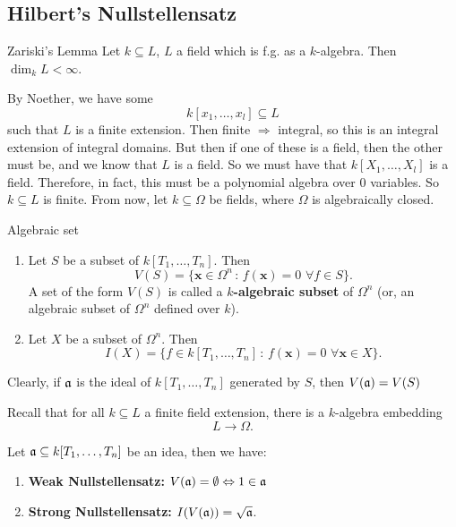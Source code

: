 \documentclass{article}
\begin{document}
\subsection{Hilbert's Nullstellensatz}
\begin{fancyprop}{Zariski's Lemma}
    Let $k \subseteq L$, $L$ a field which is f.g. as a $k$-algebra. Then $\dim_{k} L < \infty$.
\end{fancyprop}
\proof By Noether, we have some \[ k[x_{1}, \dots, x_{l}] \subseteq L \] such that $L$ is a finite extension. Then finite $\Rightarrow$ integral, so this is an integral extension of integral domains. But then if one of these is a field, then the other must be, and we know that $L$ is a field. So we must have that $k[X_{1}, \dots, X_{l}]$ is a field. Therefore, in fact, this must be a polynomial algebra over $0$ variables. So $k \subseteq L$ is finite. \endproof
From now, let $k \subseteq \Omega$ be fields, where $\Omega$ is algebraically closed.
\begin{fancydefine}{Algebraic set}
    \hspace{0.1cm}
    \begin{enumerate}
        \item Let $S$ be a subset of $k[T_{1}, \dots, T_{n}]$. Then \[V(S) = \{ \mathbf{x} \in \Omega^{n} \, : \, f(\mathbf{x}) = 0 \,\, \forall f \in S\}.\] A set of the form $V(S)$ is called a $k$\textbf{-algebraic subset} of $\Omega^{n}$ (or, an algebraic subset of $\Omega^{n}$ defined over $k$).
        \item Let $X$ be a subset of $\Omega^{n}$. Then \[ I(X) = \{ f \in k[T_{1},\dots, T_{n}] \, : \, f(\mathbf{x}) = 0 \,\, \forall \mathbf{x} \in X\}.\]
    \end{enumerate}
    Clearly, if $\mathfrak{a}$ is the ideal of $k[T_{1}, \dots, T_{n}]$ generated by $S$, then $V(\mathfrak{a}) = V(S)$
\end{fancydefine}
Recall that for all $k \subseteq L$ a finite field extension, there is a $k$-algebra embedding \[ L \to \Omega.\]
\begin{fancythm}{}
    Let $\mathfrak{a} \subseteq k[T_{1}, \dots, T_{n}]$ be an idea, then we have:\begin{enumerate}
        \item \textbf{Weak Nullstellensatz:} $V(\mathfrak{a}) = \emptyset \Leftrightarrow  1 \in \mathfrak{a}$
        \item \textbf{Strong Nullstellensatz:} $I(V(\mathfrak{a})) = \sqrt{\mathfrak{a}}$. 
    \end{enumerate}
\end{fancythm}
\end{document}

